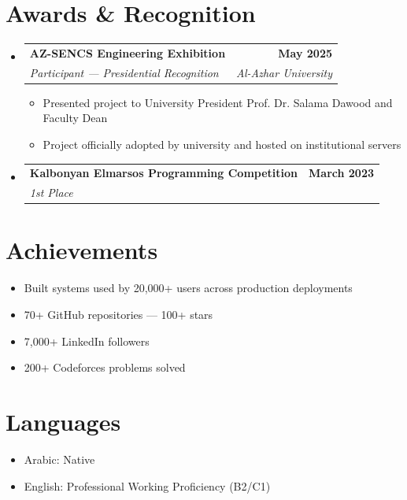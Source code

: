 \documentclass[letterpaper,11pt]{article}
\makeatletter
\newcommand{\resumeItem}[1]{
  \item\small{
    {#1 \vspace{-2pt}}
  }
}
\newcommand{\resumeSubheading}[4]{
  \vspace{-2pt}\item
    \begin{tabular*}{1.0\textwidth}[t]{l@{\extracolsep{\fill}}r}
      \textbf{#1} & \textbf{\small #2} \\
      \textit{\small#3} & \textit{\small #4} \\
    \end{tabular*}\vspace{-7pt}
}
\newcommand{\resumeSubHeadingListStart}{\begin{itemize}[leftmargin=0.0in, label={}]}
\newcommand{\resumeSubHeadingListEnd}{\end{itemize}}
\newcommand{\resumeItemListStart}{\begin{itemize}}
\newcommand{\resumeItemListEnd}{\end{itemize}\vspace{-5pt}}
\makeatother
\begin{document}
\section{Awards \& Recognition}
\resumeSubHeadingListStart
    \resumeSubheading{AZ-SENCS Engineering Exhibition}{May 2025}{Participant — Presidential Recognition}{Al-Azhar University}
        \resumeItemListStart
            \resumeItem{Presented project to University President Prof. Dr. Salama Dawood and Faculty Dean}
            \resumeItem{Project officially adopted by university and hosted on institutional servers}
        \resumeItemListEnd

    \resumeSubheading{Kalbonyan Elmarsos Programming Competition}{March 2023}{1st Place}{}
\resumeSubHeadingListEnd

\section{Achievements}
\vspace{-3pt}
\resumeItemListStart
  \resumeItem{Built systems used by 20,000+ users across production deployments}
  \resumeItem{70+ GitHub repositories — 100+ stars}
  \resumeItem{7,000+ LinkedIn followers}
  \resumeItem{200+ Codeforces problems solved}
\resumeItemListEnd

\section{Languages}
\vspace{-3pt}
\resumeItemListStart
  \resumeItem{Arabic: Native}
  \resumeItem{English: Professional Working Proficiency (B2/C1)}
\resumeItemListEnd
\end{document}
